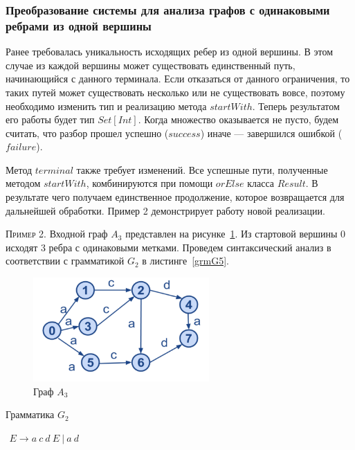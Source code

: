 \subsubsection{Преобразование системы для анализа графов с одинаковыми ребрами из одной вершины}


Ранее требовалась уникальность исходящих ребер из одной вершины. В этом случае из каждой вершины может существовать единственный путь, начинающийся с данного терминала. Если отказаться от данного ограничения, то таких путей может существовать несколько или не существовать вовсе, поэтому необходимо изменить тип и реализацию метода $startWith$. Теперь результатом его работы будет тип $Set[Int]$. Когда множество оказывается не пусто, будем считать, что разбор прошел успешно ($success$) иначе --- завершился ошибкой ($failure$).

Метод $terminal$ также требует изменений. Все успешные пути, полученные методом $startWith$, комбинируются при помощи $orElse$ класса
$Result$. В результате чего получаем единственное продолжение, которое возвращается для дальнейшей обработки. Пример 2 демонстрирует работу новой реализации.

\textsc{Пример 2.} 
Входной граф $A_3$ представлен на рисунке~\ref{Graph3}. Из стартовой вершины 0 исходят 3 ребра с одинаковыми метками. Проведем синтаксический анализ в соответствии с грамматикой $G_2$ в листинге~\ref{grmG5}.

\begin{figure}
 \centering
 \includegraphics[width=0.6\textwidth]{Smolina/pics/Graph3.png}
 \caption{Граф $A_3$}
 \label{Graph3}
\end{figure}

\begin{listing}
\caption{Грамматика $G_2$}
\label{grmG5}
\centering
$\begin{array}{rl}
E \rightarrow a \ c \ d \ E \ | \ a \ d
\end{array}$
 \end{listing}


